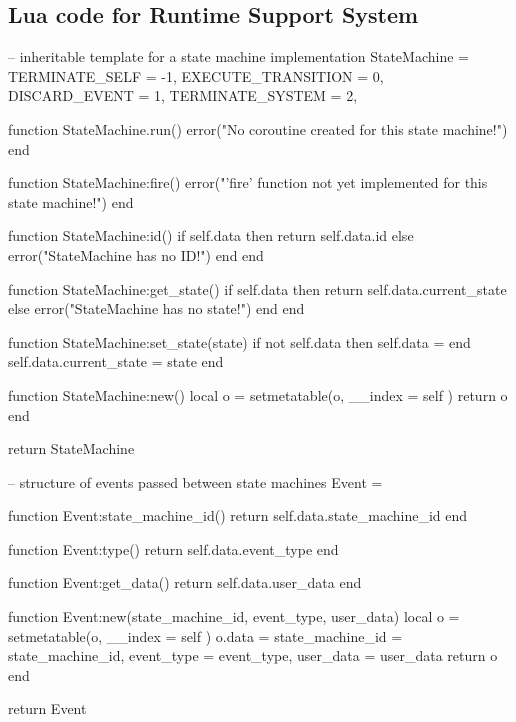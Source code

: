 \begin{appendices}

\chapter{Lua code for Runtime Support System}
\label{app:rts_code}

\begin{luacode}
-- inheritable template for a state machine implementation
StateMachine = {
	TERMINATE_SELF = -1,
	EXECUTE_TRANSITION = 0,
	DISCARD_EVENT = 1,
	TERMINATE_SYSTEM = 2,
}

function StateMachine.run()
	error("No coroutine created for this state machine!")
end

function StateMachine:fire()
	error("'fire' function not yet implemented for this state machine!")
end

function StateMachine:id()
	if self.data then
		return self.data.id
	else
		error("StateMachine has no ID!")
	end
end

function StateMachine:get_state()
	if self.data then
		return self.data.current_state
	else
		error("StateMachine has no state!")
	end
end

function StateMachine:set_state(state)
	if not self.data then
		self.data = {}
	end
	self.data.current_state = state
end

function StateMachine:new()
	local o = {}
	setmetatable(o, { __index = self })
	return o
end

return StateMachine
\end{luacode}

\begin{listing}[htp]
\begin{luacode}
-- structure of events passed between state machines
Event = {}

function Event:state_machine_id()
	return self.data.state_machine_id
end

function Event:type()
	return self.data.event_type
end

function Event:get_data()
	return self.data.user_data
end

function Event:new(state_machine_id, event_type, user_data)
	local o = {}
	setmetatable(o, { __index = self })
	o.data = {state_machine_id = state_machine_id, event_type = event_type,
						user_data = user_data}
	return o
end

return Event
\end{luacode}
\end{listing}


\end{appendices}
